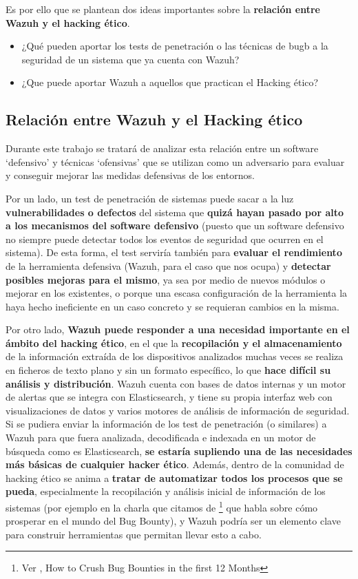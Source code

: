 Es por ello que se plantean dos ideas importantes sobre la \textbf{relación entre Wazuh y el hacking ético}.

\begin{itemize}
    \item ¿Qué pueden aportar los tests de penetración o las técnicas de \gls{bugb} a la seguridad de un sistema que ya cuenta con Wazuh?
    \item ¿Que puede aportar Wazuh a aquellos que practican el Hacking ético?
\end{itemize}

\subsection{Relación entre Wazuh y el Hacking ético}

Durante este trabajo se tratará de analizar esta relación entre un software `defensivo' y técnicas `ofensivas' que se utilizan como un adversario para evaluar y conseguir mejorar las medidas defensivas de los entornos. 

Por un lado, un test de penetración de sistemas puede sacar a la luz \textbf{vulnerabilidades o defectos}\cite{owasp} del sistema que \textbf{quizá hayan pasado por alto a los mecanismos del software defensivo} (puesto que un software defensivo no siempre puede detectar todos los eventos de seguridad que ocurren en el sistema). De esta forma, el test serviría también para \textbf{evaluar el rendimiento} de la herramienta defensiva (Wazuh, para el caso que nos ocupa) y \textbf{detectar posibles mejoras para el mismo}, ya sea por medio de nuevos módulos o mejorar en los existentes, o porque una escasa configuración de la herramienta la haya hecho ineficiente en un caso concreto y se requieran cambios en la misma.

Por otro lado, \textbf{Wazuh puede responder a una necesidad importante en el ámbito del hacking ético}, en el que la \textbf{recopilación y el almacenamiento} de la información extraída de los dispositivos analizados muchas veces se realiza en ficheros de texto plano y sin un formato específico, lo que \textbf{hace difícil su análisis y distribución}. Wazuh cuenta con bases de datos internas y un motor de alertas que se integra con Elasticsearch, y tiene su propia interfaz web con visualizaciones de datos y varios motores de análisis de información de seguridad. Si se pudiera enviar la información de los test de penetración (o similares) a Wazuh para que fuera analizada, decodificada e indexada en un motor de búsqueda como es Elasticsearch, \textbf{se estaría supliendo una de las necesidades más básicas de cualquier hacker ético}. Además, dentro de la comunidad de hacking ético se anima a \textbf{tratar de automatizar todos los procesos que se pueda}, especialmente la recopilación y análisis inicial de información de los sistemas (por ejemplo en la charla que citamos de \cite{hakluke}\footnote{Ver \cite{hakluke}, How to Crush Bug Bounties in the first 12 Months} que habla sobre cómo prosperar en el mundo del Bug Bounty), y Wazuh podría ser un elemento clave para construir herramientas que permitan llevar esto a cabo.


